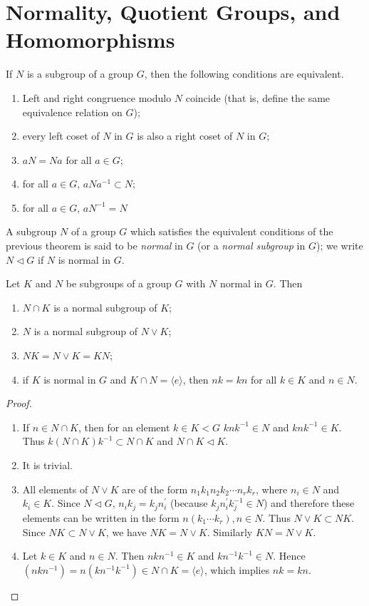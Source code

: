 \section{Normality, Quotient Groups, and Homomorphisms}
\begin{theorem}
	If $ N $ is a subgroup of a group $ G $, then the following conditions are equivalent.
	\begin{enumerate}
		\item Left and right congruence modulo $ N $ coincide (that is, define the same equivalence relation on $ G $);
		\item every left coset of $ N $ in $ G $ is also a right coset of $ N $ in $ G $;
		\item $ aN = Na $ for all $ a\in G $;
		\item for all $ a\in G $, $ aNa^{-1}\subset N $;
		\item for all $ a \in G $, $ aN^{-1}=N $
	\end{enumerate}
\end{theorem}
\begin{definition}
	A subgroup $ N $ of a group $ G $ which satisfies the equivalent conditions of the previous theorem is said to be \textit{normal} in $ G $ (or a \textit{normal subgroup} in $ G $); we write $ N\vartriangleleft G$ if $ N $ is normal in $ G $.
\end{definition}
\begin{theorem}
	Let $ K $ and $ N $ be subgroups of a group $ G $ with $ N $ normal in $ G $. Then
	\begin{enumerate}
		\item $ N \cap K $ is a normal subgroup of $ K $;
		\item $ N $ is a normal subgroup of $ N \vee K $;
		\item $ NK = N \vee K = KN $;
		\item if $ K $ is normal in $ G $ and $ K \cap N = \langle e\rangle $, then $ nk=kn $ for all $ k\in K $ and $ n \in N $.
	\end{enumerate}
\end{theorem}
\begin{proof}
	\begin{enumerate}
		\item If $ n \in N\cap K $, then for an element $ k \in K <G $ $ knk^{-1}\in N $ and $ knk^{-1}\in K $. Thus $ k (N \cap K)k^{-1}\subset N \cap K $ and $ N \cap K \vartriangleleft K $.
		\item It is trivial.
		\item All elements of $ N \vee K $ are of the form $ n_1 k_1 n_2 k_2 \cdots n_r k_r $, where $ n_i \in N $ and $ k_i \in K $. Since $ N \vartriangleleft G $, $ n_i k_j = k_j n_i^\prime $ (because $ k_j n_i^\prime k_j^{-1}\in N $) and therefore these elements can be written in the form $ n(k_1\cdots k_r) ,n \in N$. Thus $ N \vee K \subset NK $. Since $ NK \subset N \vee K $, we have $ NK =  N \vee K$. Similarly $ KN = N \vee K $.
		\item Let $ k \in K $ and $ n \in N $. Then $ nkn^{-1}\in K $ and $ k n^{-1}k^{-1}\in N $. Hence $ (nkn^{-1}) =n(kn^{-1}k^{-1})\in N \cap K = \langle e \rangle $, which implies $ nk = kn $.
	\end{enumerate}
\end{proof}
